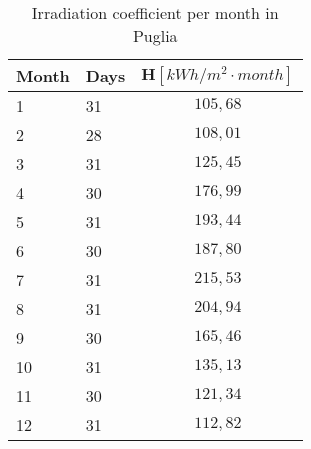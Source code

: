 \begin{table}[h!]
\centering
\begin{tabular}{|l|l|c|}
\hline
\rowcolor{bluepoli!40} \textbf{Month} & \textbf{Days} & $\textbf{H}[ kWh/m^2\cdot month]$ \\ \hline
1              & 31            & $105,68$       \\ \hline
2              & 28            & $108,01$       \\ \hline
3              & 31            & $125,45$       \\ \hline
4              & 30            & $176,99$       \\ \hline
5              & 31            & $193,44$       \\ \hline
6              & 30            & $187,80$       \\ \hline
7              & 31            & $215,53$       \\ \hline
8              & 31            & $204,94$       \\ \hline
9              & 30            & $165,46$       \\ \hline
10             & 31            & $135,13$       \\ \hline
11             & 30            & $121,34$       \\ \hline
12             & 31            & $112,82$       \\ \hline
\end{tabular}
\caption{Irradiation coefficient per month in Puglia\textsuperscript{\cite{PVINFOSYSTEM}}}
\label{tab:hpuglia}
\end{table}
